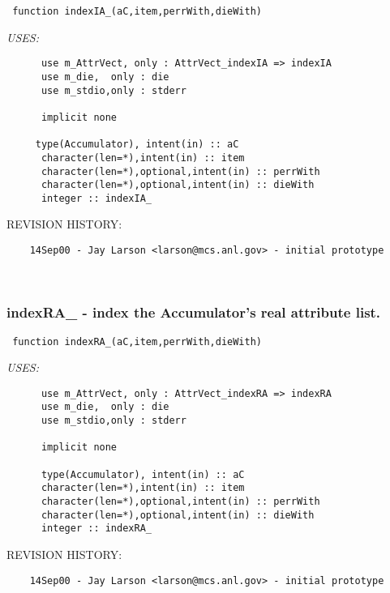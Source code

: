 
 
\begin{verbatim} 
 function indexIA_(aC,item,perrWith,dieWith)\end{verbatim}{\em USES:}
\begin{verbatim}      use m_AttrVect, only : AttrVect_indexIA => indexIA
      use m_die,  only : die
      use m_stdio,only : stderr
 
      implicit none
 
     type(Accumulator), intent(in) :: aC
      character(len=*),intent(in) :: item
      character(len=*),optional,intent(in) :: perrWith
      character(len=*),optional,intent(in) :: dieWith
      integer :: indexIA_
 \end{verbatim}{\sf REVISION HISTORY:}
\begin{verbatim}  	14Sep00 - Jay Larson <larson@mcs.anl.gov> - initial prototype\end{verbatim}
 
 
\mbox{}\hrulefill\ 
 

 \subsubsection{indexRA\_ - index the Accumulator's real attribute list.}


 
 
\begin{verbatim} 
 function indexRA_(aC,item,perrWith,dieWith)\end{verbatim}{\em USES:}
\begin{verbatim}      use m_AttrVect, only : AttrVect_indexRA => indexRA
      use m_die,  only : die
      use m_stdio,only : stderr
 
      implicit none
 
      type(Accumulator), intent(in) :: aC
      character(len=*),intent(in) :: item
      character(len=*),optional,intent(in) :: perrWith
      character(len=*),optional,intent(in) :: dieWith
      integer :: indexRA_
 \end{verbatim}{\sf REVISION HISTORY:}
\begin{verbatim}  	14Sep00 - Jay Larson <larson@mcs.anl.gov> - initial prototype\end{verbatim}


